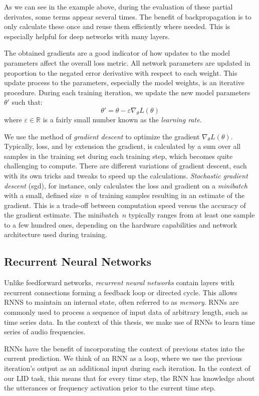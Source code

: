As we can see in the example above, during the evaluation of these partial derivates, some terms appear several times. The benefit of  backpropagation is to only calculate these once and reuse them efficiently where needed. This is especially helpful for deep networks with many layers.

The obtained gradients are a good indicator of how updates to the model parameters affect the overall loss metric. All network parameters are updated in proportion to the negated error derivative with respect to each weight. This update process to the parameters, especially the model weights, is an iterative procedure. During each training iteration, we update the new model parameters $\theta'$ such that:
$$
\theta' = \theta - \varepsilon \nabla_\theta L(\theta)
$$
where $\varepsilon \in\mathbb{R}$ is a fairly small number known as the \emph{learning rate}. 

We use the method of \emph{gradient descent} to optimize the gradient $\nabla_\theta L(\theta)$. Typically, loss, and by extension the gradient, is calculated by a sum over all samples in the training set during each training step, which becomes quite challenging to compute. There are different variations of gradient descent, each with its own tricks and tweaks to speed up the calculations. \emph{Stochastic gradient descent} (\ac{sgd}), for instance, only calculates the loss and gradient on a \emph{minibatch} with a small, defined size~$n$ of training samples resulting in an estimate of the gradient. This is a trade-off between computation speed versus the accuracy of the gradient estimate. The minibatch~$n$ typically ranges from at least one sample to a few hundred ones, depending on the hardware capabilities and network architecture used during training.


\subsection{Recurrent Neural Networks}
Unlike feedforward networks, \emph{recurrent neural networks} contain layers with recurrent connections forming a feedback loop or directed cycle. This allows RNNS to maintain an internal state, often referred to as \emph{memory}. RNNs are commonly used to process a sequence of input data of arbitrary length, such as time series data. In the context of this thesis, we make use of RNNs to learn time series of audio frequencies.

	RNNs have the benefit of incorporating the context of previous states into the current prediction. We think of an RNN as a loop, where we use the previous iteration's output as an additional input during each iteration. In the context of our LID task, this means that for every time step, the RNN has knowledge about the utterances or frequency activation prior to the current time step.

